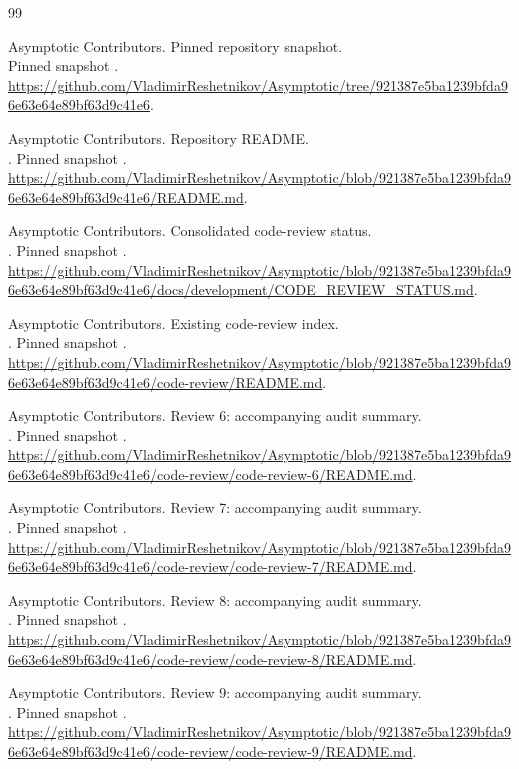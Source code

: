 \begin{thebibliography}{99}

 Asymptotic Contributors. Pinned repository snapshot.\\
Pinned snapshot . \url{https://github.com/VladimirReshetnikov/Asymptotic/tree/921387e5ba1239bfda96e63e64e89bf63d9c41e6}.

 Asymptotic Contributors. Repository README.\\
. Pinned snapshot . \url{https://github.com/VladimirReshetnikov/Asymptotic/blob/921387e5ba1239bfda96e63e64e89bf63d9c41e6/README.md}.

 Asymptotic Contributors. Consolidated code-review status.\\
. Pinned snapshot . \url{https://github.com/VladimirReshetnikov/Asymptotic/blob/921387e5ba1239bfda96e63e64e89bf63d9c41e6/docs/development/CODE_REVIEW_STATUS.md}.

 Asymptotic Contributors. Existing code-review index.\\
. Pinned snapshot . \url{https://github.com/VladimirReshetnikov/Asymptotic/blob/921387e5ba1239bfda96e63e64e89bf63d9c41e6/code-review/README.md}.

 Asymptotic Contributors. Review 6: accompanying audit summary.\\
. Pinned snapshot . \url{https://github.com/VladimirReshetnikov/Asymptotic/blob/921387e5ba1239bfda96e63e64e89bf63d9c41e6/code-review/code-review-6/README.md}.

 Asymptotic Contributors. Review 7: accompanying audit summary.\\
. Pinned snapshot . \url{https://github.com/VladimirReshetnikov/Asymptotic/blob/921387e5ba1239bfda96e63e64e89bf63d9c41e6/code-review/code-review-7/README.md}.

 Asymptotic Contributors. Review 8: accompanying audit summary.\\
. Pinned snapshot . \url{https://github.com/VladimirReshetnikov/Asymptotic/blob/921387e5ba1239bfda96e63e64e89bf63d9c41e6/code-review/code-review-8/README.md}.

 Asymptotic Contributors. Review 9: accompanying audit summary.\\
. Pinned snapshot . \url{https://github.com/VladimirReshetnikov/Asymptotic/blob/921387e5ba1239bfda96e63e64e89bf63d9c41e6/code-review/code-review-9/README.md}.


\end{thebibliography}
